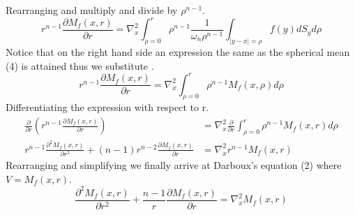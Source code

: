 \documentclass[]{article}
\begin{document}
Rearranging and multiply and divide by $\rho^{n-1}$.
\[
    r^{n-1} \frac{\partial M_f (x,r)}{\partial r} =  \nabla_{x}^{2}\int_{\rho = 0}^{r} \rho^{n-1}\frac{1}{\omega_n \rho^{n-1}} \int_{|y-x|= \rho}f(y)dS_y d\rho    
\]
Notice that on the right hand side an expression the same as the spherical mean (4) is attained thus we substitute .
\[
    r^{n-1} \frac{\partial M_f (x,r)}{\partial r} = \nabla_{x}^{2}\int_{\rho = 0}^{r} \rho^{n-1} M_{f}(x,\rho) d\rho    
\]
Differentiating the expression with respect to r.
\begin{align*}
\frac{\partial}{\partial r}\left( r^{n-1} \frac{\partial M_f (x,r)}{\partial r}\right) &= \nabla_{x}^{2} \frac{\partial}{\partial r}\int_{\rho = 0}^{r} \rho^{n-1} M_{f}(x,r) d\rho
\\
r^{n-1} \frac{\partial^2 M_f (x,r)}{\partial r^2} + (n-1)r^{n-2}\frac{\partial M_f (x,r)}{\partial r} &= \nabla_{x}^{2} r^{n-1} M_f (x,r)
\end{align*}
Rearranging and simplifying we finally arrive at Darboux's equation (2) where $ V=M_f (x,r) $.
\[
    \frac{\partial^2 M_f (x,r)}{\partial r^2} + \frac{n-1}{r} \frac{\partial M_f (x,r)}{\partial r} = \nabla_{x}^{2} M_f (x,r)    
\]
\setcounter{equation}{0}
\end{document}
